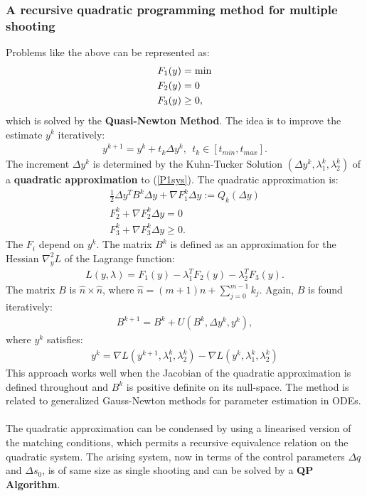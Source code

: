 \documentclass[11pt, a4paper]{article}
\theoremstyle{definition}
\begin{document}
\subsubsection{A recursive quadratic programming method for multiple shooting}
Problems like the above can be represented as:
\begin{align}\label{P1sys}
F_1(y)&=\min\\
F_2(y)&= 0 \notag \\
F_3(y) &\geq 0, \notag
\end{align}
which is solved by the \textbf{Quasi-Newton Method}.
The idea is to improve the estimate $y^k$ iteratively:
\begin{align*}
y^{k+1}= y^k + t_k \Delta y^k, \ \ t_k \in [t_{min},t_{max}].
\end{align*}
The increment $\Delta y^k$ is determined by the Kuhn-Tucker Solution $(\Delta y^k, \lambda_1^k, \lambda_2^k)$ of a \textbf{quadratic approximation} to (\ref{P1sys}).
The quadratic approximation is:
\begin{align*}
\frac{1}{2} \Delta y^T B^k\Delta y + \nabla F_1^k \Delta y := Q_k(\Delta y)\\
F_2^k + \nabla F_2^k \Delta y =0\\
F_3^k + \nabla F_3^k \Delta y \geq 0.
\end{align*}
The $F_i$ depend on $y^k$.
The matrix $B^k$ is defined as an approximation for the Hessian $\nabla^2_y L$ of the Lagrange function:
\begin{align*}
L(y, \lambda)= F_1(y) - \lambda_1^T F_2(y) - \lambda_2^TF_3(y).
\end{align*}
The matrix $B$ is $\hat n \times \hat n$, where $\hat n = (m+1)n + \sum_{j=0}^{m-1} k_j$.
Again, $B$ is found iteratively:
\begin{align*}
B^{k+1}= B^k +U(B^k, \Delta y^k, y^k),
\end{align*}
where $y^k$ satisfies:
\begin{align*}
y^k = \nabla L(y^{k+1}, \lambda_1^k, \lambda_2^k) -\nabla L(y^{k}, \lambda_1^k, \lambda_2^k)
\end{align*}
This approach works well when the Jacobian of the quadratic approximation is defined throughout and $B^k$ is positive definite on its null-space.
The method is related to generalized Gauss-Newton methods for parameter estimation in ODEs.
\\
\\
The quadratic approximation can be condensed by using a linearised version of the matching conditions, which permits a recursive equivalence relation on the quadratic system. The arising system, now in terms of the control parameters $\Delta q$ and $\Delta s_0$, is of same size as single shooting and can be solved by a \textbf{QP Algorithm}. 
\end{document}
